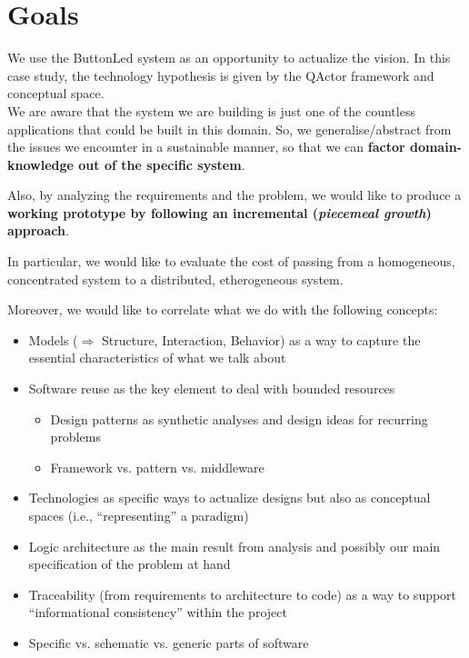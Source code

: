 \documentclass{article}
\newcommand{\labelsec}[1]{\label{sec:#1}}
\newcommand{\mycolor}{myrgb}
\newcommand{\colorize}[1]{{\color{\mycolor}#1}}
\begin{document}
\section{Goals}
\labelsec{Goals}

 We use the ButtonLed system as an opportunity to actualize the vision. In this case study, 
 \colorize{the technology hypothesis is given by the QActor framework and conceptual space}.\\

We are aware that the system we are building is just one of the countless
applications that could be built in this domain. So, we generalise/abstract from
the issues we encounter in a sustainable manner, so that we can \textbf{factor
domain-knowledge out of the specific system}.

Also, by analyzing the requirements and the problem, we would like to produce a
\textbf{working prototype by following an incremental (\emph{piecemeal growth})
approach}.

In particular, we would like to evaluate the cost of passing from a homogeneous,
concentrated system to a distributed, etherogeneous system.

Moreover, we would like to correlate what we do with the following concepts:

\begin{itemize}
  \item Models ($\Rightarrow$ Structure, Interaction, Behavior) as a way to
  capture the essential characteristics of what we talk about
  \item Software reuse as the key element to deal with bounded resources
     \begin{itemize}
       \item Design patterns as synthetic analyses and design ideas for
       recurring problems
       \item Framework vs. pattern vs. middleware
	 \end{itemize}
  \item Technologies as specific ways to actualize designs but also as
  conceptual spaces (i.e., ``representing'' a paradigm)
  \item Logic architecture as the main result from analysis and possibly our
  main specification of the problem at hand
  \item Traceability (from requirements to architecture to code) as a way to
  support ``informational consistency'' within the project
  \item Specific vs. schematic vs. generic parts of software
\end{itemize}\\
\end{document}

